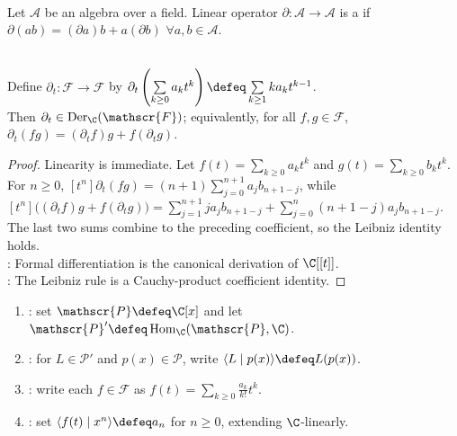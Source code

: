 \begin{definition} \label{def:derivation-on-an-algebra} \\
Let $\mathcal{A}$ be an algebra over a field. Linear operator $\partial:\mathcal{A}\to\mathcal{A}$ is a  if $\partial(ab)=(\partial a)b+a(\partial b)$ $\forall a,b\in\mathcal{A}$.
\end{definition}

\begin{proposition} \label{prop:formal-derivative-is-derivation} \\
Define $\partial_t:\mathscr{F}\to\mathscr{F}$ by $\partial_t\left(\sum\limits_{k\geq0}a_kt^k\right) \defeq \sum\limits_{k\geq1}ka_kt^{k-1}$.\\
Then $\partial_t\in\operatorname{Der}_{\C}(\mathscr{F})$; equivalently, for all $f,g\in\mathscr{F}$, $\partial_t(fg)=(\partial_t f)g+f(\partial_t g)$.
\begin{proof} Linearity is immediate. Let $f(t)=\sum\limits_{k\geq0}a_kt^k$ and $g(t)=\sum\limits_{k\geq0}b_kt^k$.\\
For $n\geq0$, $[t^n]\partial_t(fg) =(n+1)\sum\limits_{j=0}^{n+1}a_jb_{n+1-j}$, while $[t^n]\bigl((\partial_t f)g+f(\partial_t g)\bigr) =\sum\limits_{j=1}^{n+1}ja_jb_{n+1-j} +\sum\limits_{j=0}^{n}(n+1-j)a_jb_{n+1-j}$.\\
The last two sums combine to the preceding coefficient, so the Leibniz identity holds.\\
: Formal differentiation is the canonical derivation of $\C[[t]]$.\\
: The Leibniz rule is a Cauchy-product coefficient identity.
\end{proof}
\end{proposition}

\begin{definition} \label{def:umbral-algebra-functional-identification} 
\begin{enumerate}[label=(\roman*)]
\setlength{\itemsep}{0pt}
\item {}: set $\mathscr{P}\defeq\C[x]$ and let $\mathscr{P}'\defeq\operatorname{Hom}_{\C}(\mathscr{P},\C)$.
\item {}: for $L\in\mathscr{P}'$ and $p(x)\in\mathscr{P}$, write $\langle L\mid p(x)\rangle\defeq L(p(x))$.
\item {}: write each $f\in\mathscr{F}$ as $f(t)=\sum\limits_{k\geq0}\frac{a_k}{k!}t^k$.
\item {}: set $\langle f(t)\mid x^n\rangle\defeq a_n$ for $n\geq0$, extending $\C$-linearly.
\end{enumerate}
\end{definition}

